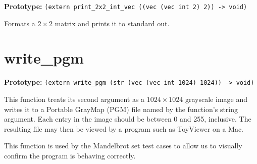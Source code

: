 \documentclass[oneside]{report}
\begin{document}
\textbf{Prototype:} \lstinline{(extern print_2x2_int_vec ((vec (vec int 2) 2)) -> void)}

Formats a $2 \times 2$ matrix and prints it to standard out.


\section{write\_pgm}

\textbf{Prototype:} \lstinline{(extern write_pgm (str (vec (vec int 1024) 1024)) -> void)}

This function treats its second argument as a $1024 \times 1024$
grayscale image and writes it to a Portable GrayMap (PGM) file named
by the function's string argument. Each entry in the image should be
between 0 and 255, inclusive. The resulting file may then be viewed by
a program such as ToyViewer on a Mac.

This function is used by the Mandelbrot set test cases to allow us to
visually confirm the program is behaving correctly.
\end{document}
